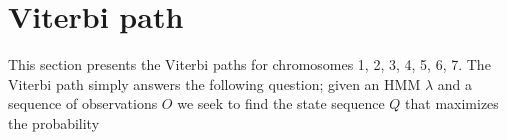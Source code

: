    



	

\section{Viterbi path}
\label{viterbi_path}

This section presents the Viterbi paths for chromosomes 1, 2, 3, 4, 5, 6, 7. 
The Viterbi path simply answers the following 
question; given an HMM $\lambda$ and a sequence of observations $O$ we seek to find the state sequence  $Q$ that maximizes the probability


